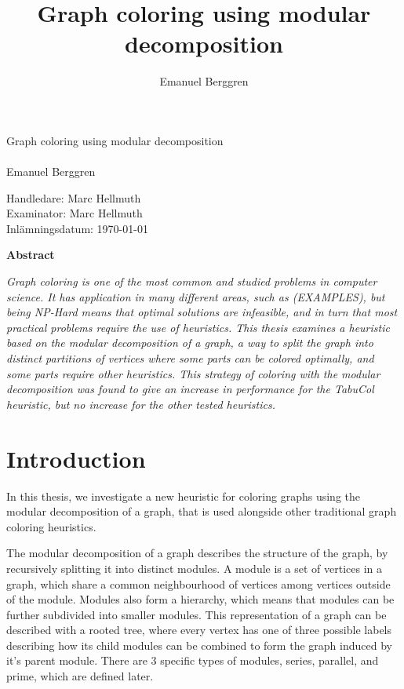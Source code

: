 \documentclass[a4paper]{article}
\author{Emanuel Berggren}
\title{Graph coloring using modular decomposition}
\newcommand{\Framsida}{\AddToShipoutPicture*{\put(0,0){\texttt{[image: kandidatfram.pdf]}}}}
\begin{document}
\Framsida 
\vspace*{4cm}
\Huge{Graph coloring using modular decomposition}\\\\ %
\Large{Emanuel Berggren} %

\vspace*{12cm}
\Large{Handledare: Marc Hellmuth} \\ 
\Large{Examinator: Marc Hellmuth} \\ 
\Large{Inlämningsdatum: \today}\\

\begin{center}
	\textbf{Abstract}
\end{center}
\textit{
Graph coloring is one of the most common and studied problems in computer
science. It has application in many different areas, such as (EXAMPLES), but
being NP-Hard means that optimal solutions are infeasible, and in turn that most
practical problems require the use of heuristics. This thesis examines a
heuristic based on the modular decomposition of a graph, a way to split the graph
into distinct partitions of vertices where some parts can be colored optimally,
and some parts require other heuristics. This strategy of coloring with the
modular decomposition was found to give an increase in performance for the
TabuCol heuristic, but no increase for the other tested heuristics.
}




\tableofcontents

\section{Introduction}


In this thesis, we investigate a new heuristic for coloring graphs using the
modular decomposition of a graph, that is used alongside other traditional
graph coloring heuristics.

The modular decomposition of a graph describes the structure of the graph, by
recursively splitting it into distinct modules. A module is a set of vertices
in a graph, which share a common neighbourhood of vertices among vertices
outside of the module. Modules also form a hierarchy, which means that modules
can be further subdivided into smaller modules. This representation of a graph
can be described with a rooted tree, where every vertex has one of three
possible labels describing how its child modules can be combined to form the
graph induced by it's parent module. There are 3 specific types of modules,
series, parallel, and prime, which are defined later.
\end{document}
